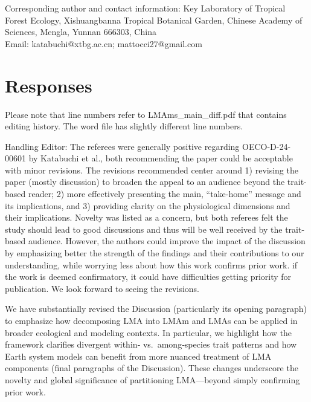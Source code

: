 \documentclass[
  12pt,
  letterpaper,
  DIV=11,
  numbers=noendperiod]{scrartcl}
\renewenvironment{quote}
  {\begin{customblockquote}\color{blockquote-text}\ignorespaces}
  {\end{customblockquote}}
\begin{document}
Corresponding author and contact information: Key Laboratory of Tropical
Forest Ecology, Xishuangbanna Tropical Botanical Garden, Chinese Academy
of Sciences, Mengla, Yunnan 666303, China\\
Email: katabuchi@xtbg.ac.cn; mattocci27@gmail.com

\newpage

\section{Responses}\label{responses}

Please note that line numbers refer to LMAms\_main\_diff.pdf that
contains editing history. The word file has slightly different line
numbers.

\begin{quote}
Handling Editor: The referees were generally positive regarding
OECO-D-24-00601 by Katabuchi et al., both recommending the paper could
be acceptable with minor revisions. The revisions recommended center
around 1) revising the paper (mostly discussion) to broaden the appeal
to an audience beyond the trait-based reader; 2) more effectively
presenting the main, ``take-home'' message and its implications, and 3)
providing clarity on the physiological dimensions and their
implications. Novelty was listed as a concern, but both referees felt
the study should lead to good discussions and thus will be well received
by the trait-based audience. However, the authors could improve the
impact of the discussion by emphasizing better the strength of the
findings and their contributions to our understanding, while worrying
less about how this work confirms prior work. if the work is deemed
confirmatory, it could have difficulties getting priority for
publication. We look forward to seeing the revisions.
\end{quote}

We have substantially revised the Discussion (particularly its opening
paragraph) to emphasize how decomposing LMA into LMAm and LMAs can be
applied in broader ecological and modeling contexts. In particular, we
highlight how the framework clarifies divergent within‐
vs.~among‐species trait patterns and how Earth system models can benefit
from more nuanced treatment of LMA components (final paragraphs of the
Discussion). These changes underscore the novelty and global
significance of partitioning LMA---beyond simply confirming prior work.
\end{document}
